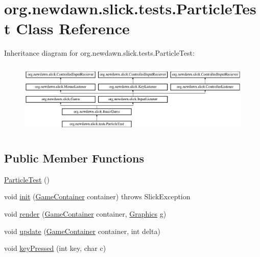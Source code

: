 \hypertarget{classorg_1_1newdawn_1_1slick_1_1tests_1_1_particle_test}{}\section{org.\+newdawn.\+slick.\+tests.\+Particle\+Test Class Reference}
\label{classorg_1_1newdawn_1_1slick_1_1tests_1_1_particle_test}
Inheritance diagram for org.\+newdawn.\+slick.\+tests.\+Particle\+Test\+:\begin{figure}[H]
\begin{center}
\leavevmode
\includegraphics[height=3.522012cm]{classorg_1_1newdawn_1_1slick_1_1tests_1_1_particle_test}
\end{center}
\end{figure}
\subsection*{Public Member Functions}
\begin{DoxyCompactItemize}
\item 
\mbox{\hyperlink{classorg_1_1newdawn_1_1slick_1_1tests_1_1_particle_test_a0fcfc9b3093b3b35f8935b27c633c1d6}{Particle\+Test}} ()
\item 
void \mbox{\hyperlink{classorg_1_1newdawn_1_1slick_1_1tests_1_1_particle_test_aad28d636e7e9b2b314d70282b1aef649}{init}} (\mbox{\hyperlink{classorg_1_1newdawn_1_1slick_1_1_game_container}{Game\+Container}} container)  throws Slick\+Exception 
\item 
void \mbox{\hyperlink{classorg_1_1newdawn_1_1slick_1_1tests_1_1_particle_test_aa5357077723958b711b7ff75eb3f5479}{render}} (\mbox{\hyperlink{classorg_1_1newdawn_1_1slick_1_1_game_container}{Game\+Container}} container, \mbox{\hyperlink{classorg_1_1newdawn_1_1slick_1_1_graphics}{Graphics}} g)
\item 
void \mbox{\hyperlink{classorg_1_1newdawn_1_1slick_1_1tests_1_1_particle_test_a233c08b351b52638bc1e1bb5a4d6e479}{update}} (\mbox{\hyperlink{classorg_1_1newdawn_1_1slick_1_1_game_container}{Game\+Container}} container, int delta)
\item 
void \mbox{\hyperlink{classorg_1_1newdawn_1_1slick_1_1tests_1_1_particle_test_a8be587ab4a9deee4b9891ac1053ccbf3}{key\+Pressed}} (int key, char c)
\end{DoxyCompactItemize}
